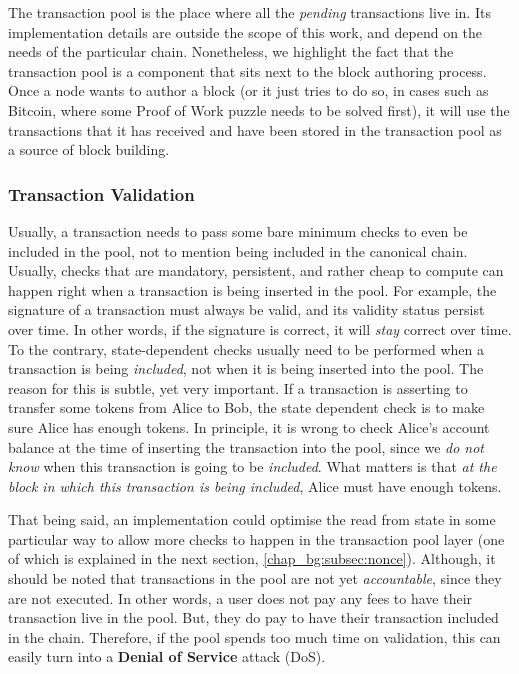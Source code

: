 The transaction pool is the place where all the \textit{pending} transactions live in. Its
implementation details are outside the scope of this work, and depend on the needs of the particular
chain. Nonetheless, we highlight the fact that the transaction pool is a component that sits next to
the block authoring process. Once a node wants to author a block (or it just tries to do so, in
cases such as Bitcoin, where some Proof of Work puzzle needs to be solved first), it will use the
transactions that it has received and have been stored in the transaction pool as a source of block
building.

\subsubsection{Transaction Validation} \label{chap_bg:subsec:validation}

Usually, a transaction needs to pass some bare minimum checks to even be included in the pool, not
to mention being included in the canonical chain. Usually, checks that are mandatory, persistent,
and rather cheap to compute can happen right when a transaction is being inserted in the pool. For
example, the signature of a transaction must always be valid, and its validity status persist over
time. In other words, if the signature is correct, it will \textit{stay} correct over time. To the
contrary, state-dependent checks usually need to be performed when a transaction is being
\textit{included}, not when it is being inserted into the pool. The reason for this is subtle, yet
very important. If a transaction is asserting to transfer some tokens from Alice to Bob, the state
dependent check is to make sure Alice has enough tokens. In principle, it is wrong to check Alice's
account balance at the time of inserting the transaction into the pool, since we \textit{do not
know} when this transaction is going to be \textit{included}. What matters is that \textit{at the
block in which this transaction is being included}, Alice must have enough tokens.

That being said, an implementation could optimise the read from state in some particular way to
allow more checks to happen in the transaction pool layer (one of which is explained in the next
section, \ref{chap_bg:subsec:nonce}). Although, it should be noted that transactions in the pool are
not yet \textit{accountable}, since they are not executed. In other words, a user does not pay any
fees to have their transaction live in the pool. But, they do pay to have their transaction included
in the chain. Therefore, if the pool spends too much time on validation, this can easily turn into a
\textbf{Denial of Service} attack (DoS).

